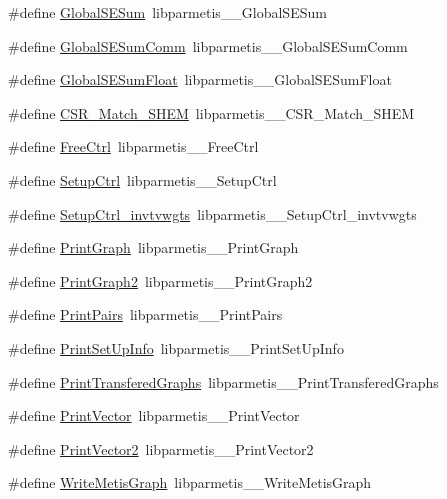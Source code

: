 \begin{DoxyCompactItemize}
\#define \hyperlink{a00960_aa8c069655f974a3765f51d544c834aef}{Global\+S\+E\+Sum}~libparmetis\+\_\+\+\_\+\+Global\+S\+E\+Sum
\item 
\#define \hyperlink{a00960_a76440d61fb917d157f4b44f7c26be950}{Global\+S\+E\+Sum\+Comm}~libparmetis\+\_\+\+\_\+\+Global\+S\+E\+Sum\+Comm
\item 
\#define \hyperlink{a00960_aa2cb09fb428bcc30c977b5a59f66942e}{Global\+S\+E\+Sum\+Float}~libparmetis\+\_\+\+\_\+\+Global\+S\+E\+Sum\+Float
\item 
\#define \hyperlink{a00960_a6e97e71ede7611389c64ee838aeca998}{C\+S\+R\+\_\+\+Match\+\_\+\+S\+H\+EM}~libparmetis\+\_\+\+\_\+\+C\+S\+R\+\_\+\+Match\+\_\+\+S\+H\+EM
\item 
\#define \hyperlink{a00960_a46f0232a0e23012cbb95e016d80ebbdb}{Free\+Ctrl}~libparmetis\+\_\+\+\_\+\+Free\+Ctrl
\item 
\#define \hyperlink{a00960_a4428e858a47ed19b7e009ee5ce63bbbc}{Setup\+Ctrl}~libparmetis\+\_\+\+\_\+\+Setup\+Ctrl
\item 
\#define \hyperlink{a00960_a636d4d3b297a9995896649afe7c2c14c}{Setup\+Ctrl\+\_\+invtvwgts}~libparmetis\+\_\+\+\_\+\+Setup\+Ctrl\+\_\+invtvwgts
\item 
\#define \hyperlink{a00960_a43dfddebda11b576bebc1ef5135e8c7e}{Print\+Graph}~libparmetis\+\_\+\+\_\+\+Print\+Graph
\item 
\#define \hyperlink{a00960_a5894ffe261811af4812b887773ce1167}{Print\+Graph2}~libparmetis\+\_\+\+\_\+\+Print\+Graph2
\item 
\#define \hyperlink{a00960_a003d2779c5b93e19eca7d896c6ed72bc}{Print\+Pairs}~libparmetis\+\_\+\+\_\+\+Print\+Pairs
\item 
\#define \hyperlink{a00960_a7519fc1222dd96232187667a95961423}{Print\+Set\+Up\+Info}~libparmetis\+\_\+\+\_\+\+Print\+Set\+Up\+Info
\item 
\#define \hyperlink{a00960_ae5e009a6cbf141b8310db5f600e7c8f9}{Print\+Transfered\+Graphs}~libparmetis\+\_\+\+\_\+\+Print\+Transfered\+Graphs
\item 
\#define \hyperlink{a00960_a72fcdf85c3d25699293389bd9348f388}{Print\+Vector}~libparmetis\+\_\+\+\_\+\+Print\+Vector
\item 
\#define \hyperlink{a00960_a5518ab50f083d1762c1c0a2776dc7dc3}{Print\+Vector2}~libparmetis\+\_\+\+\_\+\+Print\+Vector2
\item 
\#define \hyperlink{a00960_a04a644965b0e88726294df7b764f9834}{Write\+Metis\+Graph}~libparmetis\+\_\+\+\_\+\+Write\+Metis\+Graph
\item 

\end{DoxyCompactItemize}
